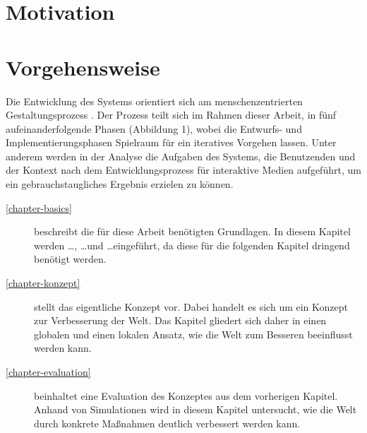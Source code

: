 \section{Motivation}


\section{Vorgehensweise}
Die Entwicklung des Systems orientiert sich am menschenzentrierten Gestaltungsprozess \cite{din_en_iso_9421-2102020-03_din_nodate}. Der Prozess teilt sich im Rahmen dieser Arbeit, in fünf aufeinanderfolgende
Phasen (Abbildung 1), wobei die Entwurfs- und Implementierungsphasen Spielraum für ein iteratives
Vorgehen lassen. Unter anderem werden in der Analyse die Aufgaben des Systems, die Benutzenden
und der Kontext nach dem Entwicklungsprozess für interaktive Medien \cite{herczeg_einfuhrung_2009} aufgeführt,
um ein gebrauchstaugliches Ergebnis erzielen zu können.
\begin{description}
  \item[\ref{chapter-basics}] beschreibt die für diese Arbeit benötigten Grundlagen. In diesem Kapitel werden \ldots, \ldots und \ldots eingeführt, da diese für die folgenden Kapitel dringend benötigt werden.
  \item[\ref{chapter-konzept}] stellt das eigentliche Konzept vor. Dabei handelt es sich um ein Konzept zur Verbesserung der Welt. Das Kapitel gliedert sich daher in einen globalen und einen lokalen Ansatz, wie die Welt zum Besseren beeinflusst werden kann.
  \item[\ref{chapter-evaluation}] beinhaltet eine Evaluation des Konzeptes aus dem vorherigen Kapitel. Anhand von Simulationen wird in diesem Kapitel untersucht, wie die Welt durch konkrete Maßnahmen deutlich verbessert werden kann.
\end{description}

